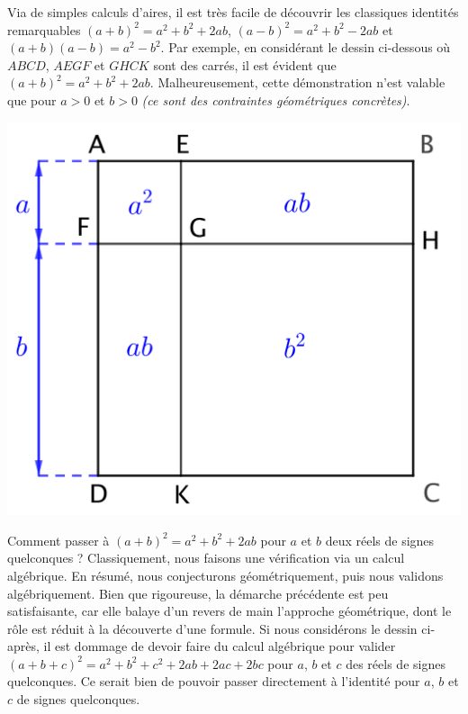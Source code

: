 Via de simples calculs d'aires, il est très facile de découvrir les classiques identités remarquables
$(a + b)^2 = a^2 + b^2 + 2ab$,
$(a - b)^2 = a^2 + b^2 - 2ab$
et
$(a + b)(a - b) = a^2 - b^2$.
%
Par exemple, en considérant le dessin ci-dessous où $ABCD$, $AEGF$ et $GHCK$ sont des carrés,
il est évident que $(a + b)^2 = a^2 + b^2 + 2 ab$.
Malheureusement, cette démonstration n'est valable que pour $a > 0$ et $b > 0$ \emph{(ce sont des contraintes géométriques concrètes)}.

\begin{center}
	\includegraphics[scale = .7]{(a+b)^2.png}
\end{center}


Comment passer à $(a + b)^2 = a^2 + b^2 + 2 ab$ pour $a$ et $b$ deux réels de signes quelconques ?
Classiquement, nous faisons une vérification via un calcul algébrique.
%
En résumé, nous conjecturons géométriquement, puis nous validons algébriquement.
%
Bien que rigoureuse, la démarche précédente est peu satisfaisante, car elle balaye d'un revers de main l'approche géométrique, dont le rôle est réduit à la découverte d'une formule.
Si nous considérons le dessin ci-après, il est dommage de devoir faire du calcul algébrique pour valider $(a + b + c)^2 = a^2 + b^2 + c^2 + 2 ab + 2 ac + 2 bc$ pour $a$, $b$ et $c$ des réels de signes quelconques.
Ce serait bien de pouvoir passer directement à l'identité pour $a$, $b$ et $c$ de signes quelconques.


